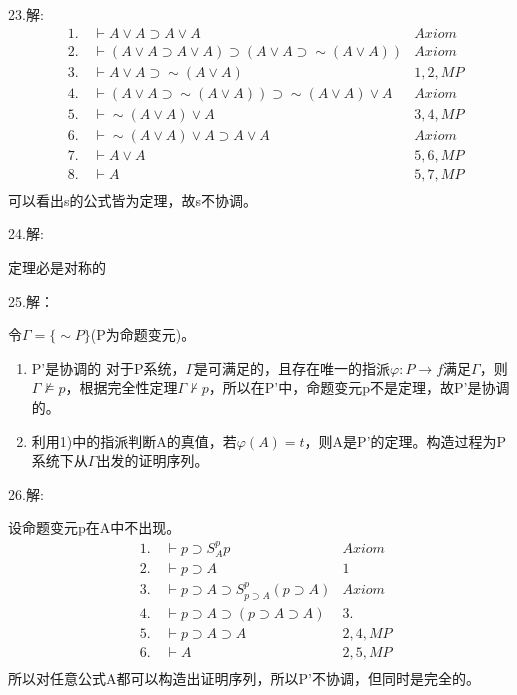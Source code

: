 \documentclass[a4paper]{ctexart}
\begin{document}
\noindent 23.解:
\begin{align*}
  &1.\quad \vdash A\vee A\supset A\vee A &Axiom \\
  &2.\quad \vdash (A\vee A\supset A\vee A) \supset \left(A\vee A\supset \sim(A\vee A)\right) &Axiom \\
  &3.\quad \vdash A\vee A\supset \sim(A\vee A) &1,2,MP \\
  &4.\quad \vdash \left(A\vee A\supset \sim(A\vee A)\right)\supset \sim(A\vee A)\vee A &Axiom \\
  &5.\quad \vdash \sim(A\vee A)\vee A &3,4,MP \\
  &6.\quad \vdash \sim(A\vee A)\vee A\supset A\vee A &Axiom \\
  &7.\quad \vdash A\vee A &5,6,MP \\
  &8.\quad \vdash A &5,7,MP \\
\end{align*}
可以看出s的公式皆为定理，故s不协调。\newline

\noindent 24.解:

定理必是对称的

\noindent 25.解：

令$\Gamma=\{\sim P\}$(P为命题变元)。
\begin{enumerate}
  \item P'是协调的
  对于P系统，$\Gamma$是可满足的，且存在唯一的指派$\varphi:{P}\rightarrow f$满足$\Gamma$，则$\Gamma\not\models p$，根据完全性定理$\Gamma\not\vdash p$，所以在P'中，命题变元p不是定理，故P'是协调的。
  \item 利用1)中的指派判断A的真值，若$\varphi(A)=t$，则A是P'的定理。构造过程为P系统下从$\Gamma$出发的证明序列。
\end{enumerate}

\noindent 26.解:

设命题变元p在A中不出现。
\begin{align*}
  &1.\quad \vdash p\supset S_{A}^p p  &Axiom \\
  &2.\quad \vdash p\supset A &1 \\
  &3.\quad \vdash p\supset A\supset S_{p\supset A}^p(p\supset A) &Axiom \\
  &4.\quad \vdash p\supset A\supset(p\supset A\supset A) &3. \\
  &5.\quad \vdash p\supset A\supset A &2,4,MP \\
  &6.\quad \vdash A &2,5,MP \\
\end{align*}
所以对任意公式A都可以构造出证明序列，所以P'不协调，但同时是完全的。\newline
\end{document}

